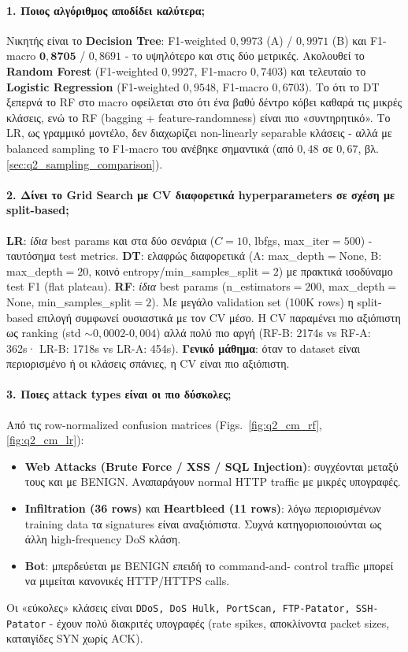 \documentclass[12pt,a4paper,twoside]{book}
\begin{document}
\paragraph{1. Ποιος αλγόριθμος αποδίδει καλύτερα;}
Νικητής είναι το \textbf{Decision Tree}: F1-weighted \(0{,}9973\) (A) /
\(0{,}9971\) (B) και F1-macro \(\mathbf{0{,}8705}\) / \(0{,}8691\) - το
υψηλότερο και στις δύο μετρικές. Ακολουθεί το \textbf{Random Forest}
(F1-weighted \(0{,}9927\), F1-macro \(0{,}7403\)) και τελευταίο το
\textbf{Logistic Regression} (F1-weighted \(0{,}9548\), F1-macro
\(0{,}6703\)). Το ότι το DT ξεπερνά το RF στο macro οφείλεται στο ότι ένα
βαθύ δέντρο κόβει καθαρά τις μικρές κλάσεις, ενώ το RF (bagging +
feature-randomness) είναι πιο «συντηρητικό». Το LR, ως γραμμικό μοντέλο,
δεν διαχωρίζει non-linearly separable κλάσεις - αλλά με balanced sampling
το F1-macro του ανέβηκε σημαντικά (από \(0{,}48\) σε \(0{,}67\), βλ.
\ref{sec:q2_sampling_comparison}).

\paragraph{2. Δίνει το Grid Search με CV διαφορετικά hyperparameters σε σχέση με split-based;}
\textbf{LR}: \emph{ίδια} best params και στα δύο σενάρια
(\(C=10\), lbfgs, max\_iter\(=500\)) - ταυτόσημα test metrics. \textbf{DT}:
ελαφρώς διαφορετικά (A: max\_depth\(=\)None, B: max\_depth\(=20\), κοινό
entropy/min\_samples\_split\(=2\)) με πρακτικά ισοδύναμο test F1 (flat
plateau). \textbf{RF}: \emph{ίδια} best params (n\_estimators\(=200\),
max\_depth\(=\)None, min\_samples\_split\(=2\)). Με μεγάλο validation set
(100K rows) η split-based επιλογή συμφωνεί ουσιαστικά με τον CV μέσο.
Η CV παραμένει πιο αξιόπιστη ως ranking (std \(\sim 0{,}0002\text{-}0{,}004\))
αλλά πολύ πιο αργή (RF-B: 2174s vs RF-A: 362s· LR-B: 1718s vs LR-A: 454s).
\textbf{Γενικό μάθημα}: όταν το dataset είναι περιορισμένο ή οι κλάσεις
σπάνιες, η CV είναι πιο αξιόπιστη.

\paragraph{3. Ποιες attack types είναι οι πιο δύσκολες;}
Από τις row-normalized confusion matrices (Figs.~\ref{fig:q2_cm_rf},
\ref{fig:q2_cm_lr}):
\begin{itemize}
    \item \textbf{Web Attacks (Brute Force / XSS / SQL Injection)}:
    συγχέονται μεταξύ τους και με BENIGN. Αναπαράγουν normal HTTP
    traffic με μικρές υπογραφές.
    \item \textbf{Infiltration (36 rows)} και
    \textbf{Heartbleed (11 rows)}: λόγω περιορισμένων training data
    τα signatures είναι αναξιόπιστα. Συχνά κατηγοριοποιούνται ως
    άλλη high-frequency DoS κλάση.
    \item \textbf{Bot}: μπερδεύεται με BENIGN επειδή το command-and-
    control traffic μπορεί να μιμείται κανονικές HTTP/HTTPS calls.
\end{itemize}
Οι «εύκολες» κλάσεις είναι \texttt{DDoS, DoS Hulk, PortScan,
FTP-Patator, SSH-Patator} - έχουν πολύ διακριτές υπογραφές (rate
spikes, αποκλίνοντα packet sizes, καταιγίδες SYN χωρίς ACK).
\end{document}
